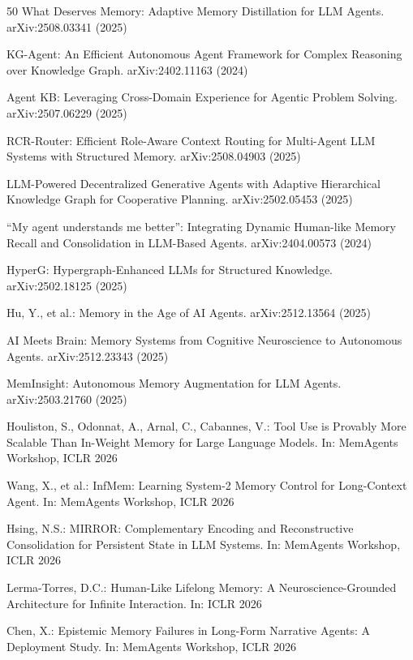 \documentclass[hf]{ceurart}
\begin{document}
\begin{thebibliography}{50}
What Deserves Memory: Adaptive Memory Distillation for LLM Agents.
arXiv:2508.03341 (2025)

KG-Agent: An Efficient Autonomous Agent Framework for Complex
Reasoning over Knowledge Graph. arXiv:2402.11163 (2024)

Agent KB: Leveraging Cross-Domain Experience for Agentic Problem
Solving. arXiv:2507.06229 (2025)

RCR-Router: Efficient Role-Aware Context Routing for Multi-Agent LLM
Systems with Structured Memory. arXiv:2508.04903 (2025)

LLM-Powered Decentralized Generative Agents with Adaptive
Hierarchical Knowledge Graph for Cooperative Planning.
arXiv:2502.05453 (2025)

``My agent understands me better'': Integrating Dynamic Human-like
Memory Recall and Consolidation in LLM-Based Agents.
arXiv:2404.00573 (2024)

HyperG: Hypergraph-Enhanced LLMs for Structured Knowledge.
arXiv:2502.18125 (2025)

Hu, Y., et al.: Memory in the Age of AI Agents.
arXiv:2512.13564 (2025)

AI Meets Brain: Memory Systems from Cognitive Neuroscience to
Autonomous Agents. arXiv:2512.23343 (2025)

MemInsight: Autonomous Memory Augmentation for LLM Agents.
arXiv:2503.21760 (2025)

Houliston, S., Odonnat, A., Arnal, C., Cabannes, V.: Tool Use is
Provably More Scalable Than In-Weight Memory for Large Language
Models. In: MemAgents Workshop, ICLR 2026

Wang, X., et al.: InfMem: Learning System-2 Memory Control for
Long-Context Agent. In: MemAgents Workshop, ICLR 2026

Hsing, N.S.: MIRROR: Complementary Encoding and Reconstructive
Consolidation for Persistent State in LLM Systems. In: MemAgents
Workshop, ICLR 2026

Lerma-Torres, D.C.: Human-Like Lifelong Memory: A
Neuroscience-Grounded Architecture for Infinite Interaction.
In: ICLR 2026

Chen, X.: Epistemic Memory Failures in Long-Form Narrative Agents:
A Deployment Study. In: MemAgents Workshop, ICLR 2026


\end{thebibliography}
\end{document}
